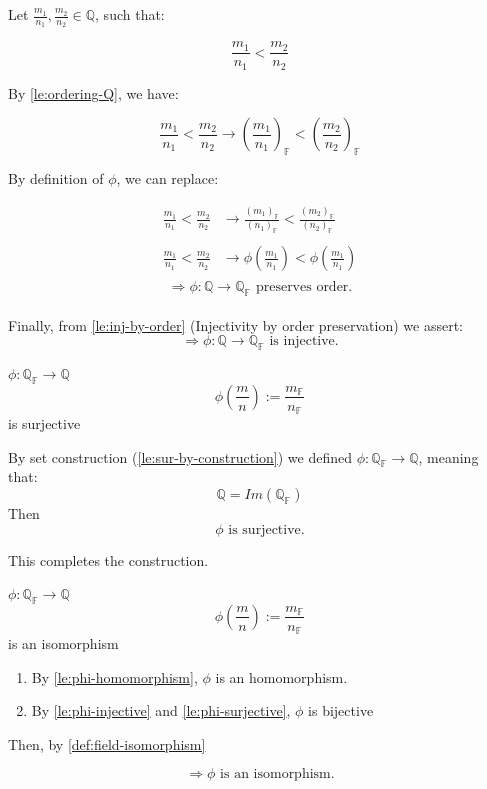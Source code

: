 \begin{bookproof}
Let $\frac{m_1}{n_1}, \frac{m_2}{n_2} \in \mathbb{Q}$, such that:

$$\frac{m_1}{n_1} < \frac{m_2}{n_2}$$

By \cref{le:ordering-Q}, we have:

$$\frac{m_1}{n_1} < \frac{m_2}{n_2} \rightarrow (\frac{m_1}{n_1})_\mathbb{F} < (\frac{m_2}{n_2})_\mathbb{F}$$

By definition of $\phi$, we can replace:

\begin{align*}
\frac{m_1}{n_1} < \frac{m_2}{n_2} &\rightarrow \frac{(m_1)_\mathbb{F}}{(n_1)_\mathbb{F}} < \frac{(m_2)_\mathbb{F}}{(n_2)_\mathbb{F}} \\\\
\frac{m_1}{n_1} < \frac{m_2}{n_2} &\rightarrow \phi(\frac{m_1}{n_1}) < \phi(\frac{m_1}{n_1}) \\
\end{align*}
$$\Rightarrow \phi : \mathbb{Q} \rightarrow \mathbb{Q_F} \text{ preserves order.}$$ \\

Finally, from \cref{le:inj-by-order} (Injectivity by order preservation) we assert:\\

$$\Rightarrow \phi : \mathbb{Q} \rightarrow \mathbb{Q_F} \text{ is injective.}$$
\end{bookproof}

\begin{lemma}\label{le:phi-surjective}
$\phi: \mathbb{Q_F} \rightarrow \mathbb{Q}$
$$\phi(\frac{m}{n}) := \frac{m_\mathbb{F}}{n_\mathbb{F}}$$ is surjective
\end{lemma}

\begin{bookproof}
By set construction (\cref{le:sur-by-construction}) we defined $\phi: \mathbb{Q_F} \rightarrow \mathbb{Q}$, meaning that:
$$\mathbb{Q} = Im(\mathbb{Q_F})$$
Then
$$\phi \text{ is surjective.}$$
\end{bookproof}

This completes the construction.

\begin{lemma}
$\phi: \mathbb{Q_F} \rightarrow \mathbb{Q}$
$$\phi(\frac{m}{n}) := \frac{m_\mathbb{F}}{n_\mathbb{F}}$$ is an isomorphism
\end{lemma}

\begin{bookproof}
\begin{enumerate}
\item By \cref{le:phi-homomorphism}, $\phi$ is an homomorphism.
\item By \cref{le:phi-injective} and \cref{le:phi-surjective}, $\phi$ is bijective
\end{enumerate}
Then, by \cref{def:field-isomorphism}

$$\Rightarrow \phi \text{ is an isomorphism}.$$
\end{bookproof}

